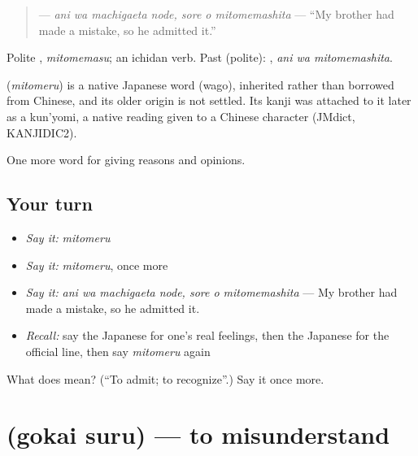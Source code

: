 \begin{quote}
\textbf{  } — \emph{ani wa machigaeta node, sore o mitomemashita} — \textquotedblleft{}My brother had made a mistake, so he admitted it.\textquotedblright{}
\end{quote}

Polite \textbf{}, \emph{mitomemasu}; an ichidan verb. Past (polite): \textbf{ }, \emph{ani wa mitomemashita}.

\begin{cousinweb}
\textbf{} (\emph{mitomeru}) is a native Japanese word (wago), inherited rather than borrowed from Chinese, and its older origin is not settled. Its kanji was attached to it later as a kun'yomi, a native reading given to a Chinese character (JMdict, KANJIDIC2).
\end{cousinweb}

\begin{grammarlens}[title={What you've built}]
One more word for giving reasons and opinions.
\end{grammarlens}

\subsection*{Your turn}
\begin{itemize}
\raggedright
  \item \emph{Say it:} \emph{mitomeru}
  \item \emph{Say it:} \emph{mitomeru}, once more
  \item \emph{Say it:} \emph{ani wa machigaeta node, sore o mitomemashita} — My brother had made a mistake, so he admitted it.
  \item \emph{Recall:} say the Japanese for one's real feelings, then the Japanese for the official line, then say \emph{mitomeru} again
\end{itemize}

\begin{tcolorbox}[breakable,colback=teal!4,colframe=teal!35!black,title={Before you move on}]
What does  mean? (\textquotedblleft{}To admit; to recognize\textquotedblright{}.) Say it once more.
\end{tcolorbox}
\section[\texorpdfstring{\ja{ごかいする} (gokai suru)}{ごかいする (gokai suru)}]{ (gokai suru) — to misunderstand}

